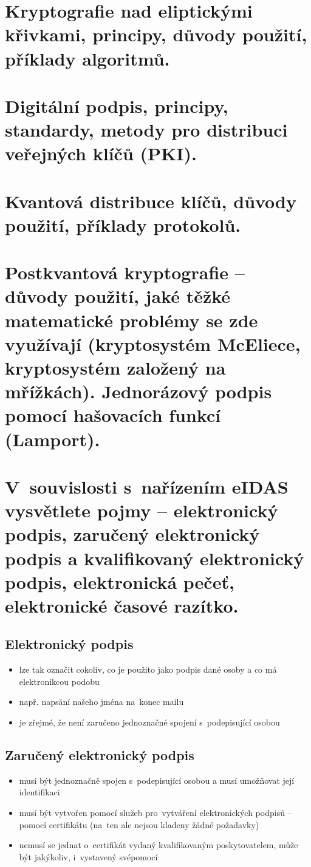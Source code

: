 \clearpage
\section{Kryptografie nad eliptickými křivkami, principy, důvody použití, příklady algoritmů.}


\clearpage
\section{Digitální podpis, principy, standardy, metody pro distribuci veřejných klíčů (PKI).}


\clearpage
\section{Kvantová distribuce klíčů, důvody použití, příklady protokolů.}


\clearpage
\section{Postkvantová kryptografie -- důvody použití, jaké těžké matematické problémy se zde využívají (kryptosystém McEliece, kryptosystém založený na mřížkách). Jednorázový podpis pomocí hašovacích funkcí (Lamport).}


\clearpage
\section{V~souvislosti s~nařízením eIDAS vysvětlete pojmy -- elektronický podpis, zaručený elektronický podpis a kvalifikovaný elektronický podpis, elektronická pečeť, elektronické časové razítko.}
\subsection{Elektronický podpis}
\begin{itemize}
    \item lze tak označit cokoliv, co je použito jako podpis dané osoby a co má elektronikcou podobu
    \item např. napsání našeho jména na~konec mailu
    \item je zřejmé, že není zaručeno jednoznačné spojení s~podepisující osobou
\end{itemize}

\subsection{Zaručený elektronický podpis}
\begin{itemize}
    \item musí být jednoznačně spojen s~podepisující osobou a musí umožňovat její identifikaci
    \item musí být vytvořen pomocí služeb pro~vytváření elektronických podpisů -- pomocí certifikátu (na~ten ale nejsou kladeny žádné požadavky)
    \item nemusí se jednat o~certifikát vydaný kvalifikovaným poskytovatelem, může být jakýkoliv, i~vystavený svépomocí
\end{itemize}


